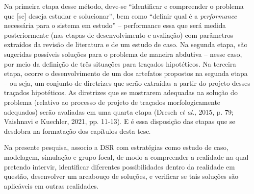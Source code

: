 \documentclass[12pt, a4paper]{book} %
\begin{document}
        Na primeira etapa desse método, deve-se ``identificar e compreender o problema que [se] deseja estudar e solucionar'', bem como ``definir qual é a \textit{performance} necessária para o sistema em estudo'' – performance essa que será medida posteriormente (nas etapas de desenvolvimento e avaliação) com parâmetros extraídos da revisão de literatura e de um estudo de caso. Na segunda etapa, são sugeridas possíveis soluções para o problema de maneira abdutiva – nesse caso, por meio da definição de três situações para traçados hipotéticos. Na terceira etapa, ocorre o desenvolvimento de um dos artefatos propostos na segunda etapa – ou seja, um conjunto de diretrizes que serão extraídas a partir do projeto desses traçados hipotéticos. As diretrizes que se mostrarem adequadas na solução do problema (relativo ao processo de projeto de traçados morfologicamente adequados) serão avaliadas em uma quarta etapa (Dresch \textit{et al.}, 2015, p. 79; Vaishnavi e Kuechler, 2021, pp. 11-13). E é essa disposição das etapas que se desdobra na formatação dos capítulos desta tese.

        Na presente pesquisa, associo a DSR com estratégias como estudo de caso, modelagem, simulação e grupo focal, de modo a compreender a realidade na qual pretendo intervir, identificar diferentes possibilidades dentro da realidade em questão, desenvolver um arcabouço de soluções, e verificar se tais soluções são aplicáveis em outras realidades.
\end{document}
